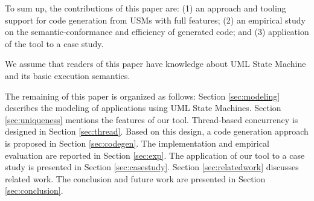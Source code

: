 
To sum up, the contributions of this paper are: (1) an approach and tooling support for code generation from USMs with full features; 
(2) an empirical study on the semantic-conformance and efficiency of generated code;
and (3) application of the tool to a case study.  

We assume that readers of this paper have knowledge about UML State Machine and its basic execution semantics.

The remaining of this paper is organized as follows: Section \ref{sec:modeling} describes the modeling of applications using UML State Machines. 
Section \ref{sec:uniqueness} mentions the features of our tool.
Thread-based concurrency is designed in Section \ref{sec:thread}. 
Based on this design, a code generation approach is proposed in Section \ref{sec:codegen}. 
The implementation and empirical evaluation are reported in Section \ref{sec:exp}. 
The application of our tool to a case study is presented in Section \ref{sec:casestudy}.
Section \ref{sec:relatedwork} discusses related work. The conclusion and future work are presented in Section \ref{sec:conclusion}.